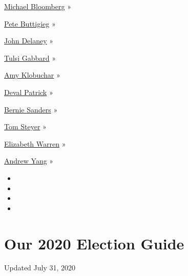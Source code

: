 \href{https://www.nytimes.com/interactive/2020/us/elections/michael-bloomberg.html}{Michael
Bloomberg} »

\href{https://www.nytimes.com/interactive/2020/us/elections/pete-buttigieg.html}{Pete
Buttigieg} »

\href{https://www.nytimes.com/interactive/2020/us/elections/john-delaney.html}{John
Delaney} »

\href{https://www.nytimes.com/interactive/2020/us/elections/tulsi-gabbard.html}{Tulsi
Gabbard} »

\href{https://www.nytimes.com/interactive/2020/us/elections/amy-klobuchar.html}{Amy
Klobuchar} »

\href{https://www.nytimes.com/interactive/2020/us/elections/deval-patrick.html}{Deval
Patrick} »

\href{https://www.nytimes.com/interactive/2020/us/elections/bernie-sanders.html}{Bernie
Sanders} »

\href{https://www.nytimes.com/interactive/2020/us/elections/tom-steyer.html}{Tom
Steyer} »

\href{https://www.nytimes.com/interactive/2020/us/elections/elizabeth-warren.html}{Elizabeth
Warren} »

\href{https://www.nytimes.com/interactive/2020/us/elections/andrew-yang.html}{Andrew
Yang} »

\begin{itemize}
\item
\item
\item
\item
\end{itemize}

\hypertarget{our-2020-election-guide}{%
\section{Our 2020 Election Guide}\label{our-2020-election-guide}}

Updated July 31, 2020

